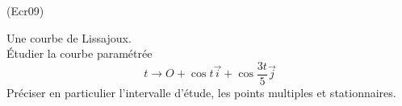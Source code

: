 \begin{tiny}(Ecr09)\end{tiny} Une courbe de Lissajoux.\\
\'Etudier la courbe paramétrée
\begin{displaymath}
 t\rightarrow O + \cos t \overrightarrow i + \cos \frac{3t}{5}\overrightarrow j
\end{displaymath}
 Préciser en particulier l'intervalle d'étude, les points multiples et stationnaires.